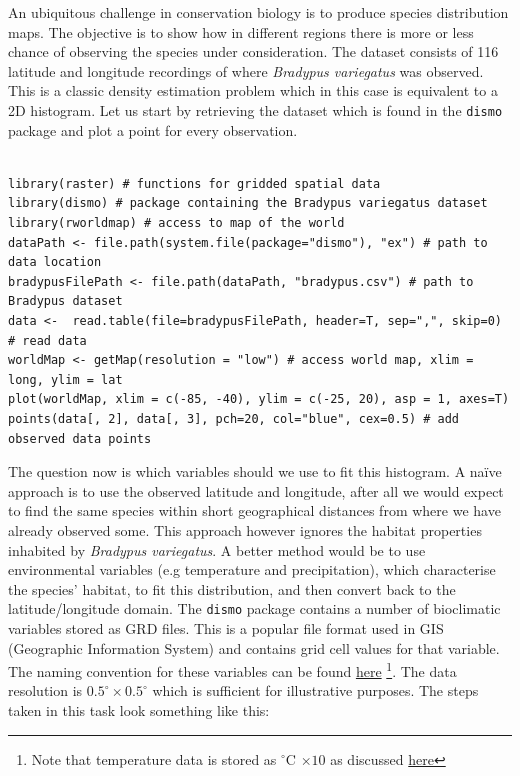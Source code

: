\documentclass[a4paper,11pt]{article}
\begin{document}
An ubiquitous challenge in conservation biology is to produce species distribution maps. The objective
is to show how in different regions there is more or less chance of observing the species under consideration.
The dataset consists of 116 latitude and longitude recordings of where \textit{Bradypus variegatus} was observed.
This is a classic density estimation problem which in this case is equivalent to a 2D histogram. Let us start by 
retrieving the dataset which is found in the \texttt{dismo} package and plot a point for every observation. 
\\\\
\begin{lstlisting}[style=RCode]
library(raster) # functions for gridded spatial data
library(dismo) # package containing the Bradypus variegatus dataset
library(rworldmap) # access to map of the world
dataPath <- file.path(system.file(package="dismo"), "ex") # path to data location
bradypusFilePath <- file.path(dataPath, "bradypus.csv") # path to Bradypus dataset
data <-  read.table(file=bradypusFilePath, header=T, sep=",", skip=0) # read data
worldMap <- getMap(resolution = "low") # access world map, xlim = long, ylim = lat
plot(worldMap, xlim = c(-85, -40), ylim = c(-25, 20), asp = 1, axes=T) 
points(data[, 2], data[, 3], pch=20, col="blue", cex=0.5) # add observed data points
\end{lstlisting}

The question now is which variables should we use to fit this histogram. A na\"{i}ve approach is to use the
observed latitude and longitude, after all we would expect to find the same species within short geographical 
distances from where we have already observed some. This approach however ignores the habitat properties
inhabited by \textit{Bradypus variegatus}. A better method would be to use environmental variables (e.g temperature and precipitation), 
which characterise the species' habitat, to fit this distribution, and then convert back to the 
latitude/longitude domain. The \texttt{dismo} package contains a number of bioclimatic variables stored as 
GRD files. This is a popular file format used in GIS (Geographic Information System) and contains grid cell
values for that variable. The naming convention for these variables can be found \href{http://www.worldclim.org/bioclim}{here}
\footnote{Note that temperature data is stored as $^\circ$C $\times 10$ as discussed \href{http://www.worldclim.org/formats}{here}}.	   
The data resolution is $0.5^\circ \times 0.5^\circ$ which is sufficient for illustrative purposes.
The steps taken in this task look something like this:
\end{document}
